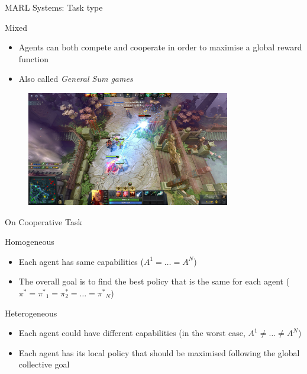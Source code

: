 \documentclass[presentation]{beamer}\mode<presentation>{\usetheme{AMSBolognaFC}}
\begin{document}
\begin{frame}{MARL Systems: Task type}
	\begin{exampleblock}{Mixed}
		\begin{itemize}
			\item Agents can both compete and cooperate in order to maximise a global reward function
			\item Also called \textit{General Sum games}
		\end{itemize}
	\end{exampleblock}

	\begin{figure}
		\includegraphics[height=5cm]{img/mixed}
	\end{figure}
\end{frame}

\begin{frame}{On Cooperative Task}
	\begin{exampleblock}{Homogeneous}
		\begin{itemize}
			\item Each agent has same capabilities ($A^1 = \dots = A^N$)
			\item The overall goal is to find the best policy that is the same for each agent ($\pi^* = {\pi^{*}}_1 = \pi^{*}_2 = \dots = {\pi^{*}}_N$)
		\end{itemize}
	\end{exampleblock}
	\begin{exampleblock}{Heterogeneous}
		\begin{itemize}
			\item Each agent could have different capabilities (in the worst case, $A^1 \neq \dots \neq A^N$)
			\item Each agent has its local policy that should be maximised following the global collective goal
		\end{itemize}
	\end{exampleblock}
\end{frame}
\end{document}
